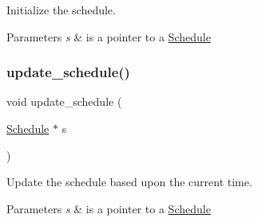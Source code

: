 Initialize the schedule. 


\begin{DoxyParams}{Parameters}
{\em s} & is a pointer to a \hyperlink{structSchedule}{Schedule} \\
\hline
\end{DoxyParams}
\mbox{\label{group__schedule_gabd767b69f0c96529550af0593e8efe75}} 
\subsubsection{\texorpdfstring{update\+\_\+schedule()}{update\_schedule()}}
{\footnotesize\ttfamily void update\+\_\+schedule (\begin{DoxyParamCaption}\item[{\hyperlink{structSchedule}{Schedule} $\ast$}]{s }\end{DoxyParamCaption})}



Update the schedule based upon the current time. 


\begin{DoxyParams}{Parameters}
{\em s} & is a pointer to a \hyperlink{structSchedule}{Schedule} \\
\hline
\end{DoxyParams}
